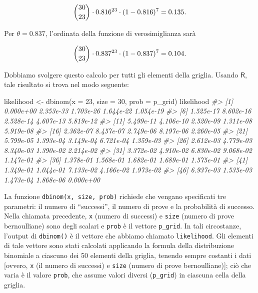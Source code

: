 \documentclass[
  11pt,
]{krantz}
\makeatletter
\newenvironment{Shaded}{\begin{snugshade}}{\end{snugshade}}
\newcommand{\AttributeTok}[1]{\textcolor[rgb]{0.61,0.61,0.61}{#1}}
\newcommand{\CommentTok}[1]{\textcolor[rgb]{0.37,0.37,0.37}{\textit{#1}}}
\newcommand{\DecValTok}[1]{\textcolor[rgb]{0.06,0.06,0.06}{#1}}
\newcommand{\FunctionTok}[1]{\textcolor[rgb]{0,0,0}{#1}}
\newcommand{\NormalTok}[1]{#1}
\newcommand{\OtherTok}[1]{\textcolor[rgb]{0.37,0.37,0.37}{#1}}
\newenvironment{kframe}{%
\medskip{}
\setlength{\fboxsep}{.8em}
 \def\at@end@of@kframe{}%
 \ifinner\ifhmode%
  \def\at@end@of@kframe{\end{minipage}}%
  \begin{minipage}{\columnwidth}%
 \fi\fi%
 \def\FrameCommand##1{\hskip\@totalleftmargin \hskip-\fboxsep
 \colorbox{shadecolor}{##1}\hskip-\fboxsep
     \hskip-\linewidth \hskip-\@totalleftmargin \hskip\columnwidth}%
 \MakeFramed {\advance\hsize-\width
   \@totalleftmargin\z@ \linewidth\hsize
   \@setminipage}}%
 {\par\unskip\endMakeFramed%
 \at@end@of@kframe}
\renewenvironment{Shaded}{\begin{kframe}}{\end{kframe}}
\newcommand{\R}{\textsf{R}} %
\theoremstyle{definition}
\theoremstyle{definition}
\theoremstyle{definition}
\theoremstyle{definition}
\theoremstyle{remark}
\makeatother
\begin{document}
\begin{equation}
\binom{30}{23} \cdot 0.816^{23} \cdot (1 - 0.816)^{7} = 0.135.\notag
\end{equation}

Per \(\theta = 0.837\), l'ordinata della funzione di verosimiglianza sarà

\begin{equation}
\binom{30}{23} \cdot 0.837^{23} \cdot (1 - 0.837)^{7} = 0.104.\notag
\end{equation}

Dobbiamo svolgere questo calcolo per tutti gli elementi della griglia. Usando \(\R\), tale risultato si trova nel modo seguente:

\begin{Shaded}
\begin{Highlighting}[]
\NormalTok{likelihood }\OtherTok{\textless{}{-}} \FunctionTok{dbinom}\NormalTok{(}\AttributeTok{x =} \DecValTok{23}\NormalTok{, }\AttributeTok{size =} \DecValTok{30}\NormalTok{, }\AttributeTok{prob =}\NormalTok{ p\_grid)}
\NormalTok{likelihood}
\CommentTok{\#\textgreater{}  [1] 0.000e+00 2.353e{-}33 1.703e{-}26 1.644e{-}22 1.054e{-}19}
\CommentTok{\#\textgreater{}  [6] 1.525e{-}17 8.602e{-}16 2.528e{-}14 4.607e{-}13 5.819e{-}12}
\CommentTok{\#\textgreater{} [11] 5.499e{-}11 4.106e{-}10 2.520e{-}09 1.311e{-}08 5.919e{-}08}
\CommentTok{\#\textgreater{} [16] 2.362e{-}07 8.457e{-}07 2.749e{-}06 8.197e{-}06 2.260e{-}05}
\CommentTok{\#\textgreater{} [21] 5.799e{-}05 1.393e{-}04 3.149e{-}04 6.721e{-}04 1.359e{-}03}
\CommentTok{\#\textgreater{} [26] 2.612e{-}03 4.779e{-}03 8.340e{-}03 1.390e{-}02 2.214e{-}02}
\CommentTok{\#\textgreater{} [31] 3.372e{-}02 4.910e{-}02 6.830e{-}02 9.068e{-}02 1.147e{-}01}
\CommentTok{\#\textgreater{} [36] 1.378e{-}01 1.568e{-}01 1.682e{-}01 1.689e{-}01 1.575e{-}01}
\CommentTok{\#\textgreater{} [41] 1.349e{-}01 1.044e{-}01 7.133e{-}02 4.166e{-}02 1.973e{-}02}
\CommentTok{\#\textgreater{} [46] 6.937e{-}03 1.535e{-}03 1.473e{-}04 1.868e{-}06 0.000e+00}
\end{Highlighting}
\end{Shaded}

La funzione \texttt{dbinom(x,\ size,\ prob)} richiede che vengano specificati tre parametri: il numero di ``successi'', il numero di prove e la probabilità di successo. Nella chiamata precedente, \texttt{x} (numero di successi) e \texttt{size} (numero di prove bernoulliane) sono degli scalari e \texttt{prob} è il vettore \texttt{p\_grid}. In tali circostanze, l'output di \texttt{dbinom()} è il vettore che abbiamo chiamato \texttt{likelihood}. Gli elementi di tale vettore sono stati calcolati applicando la formula della distribuzione binomiale a ciascuno dei 50 elementi della griglia, tenendo sempre costanti i dati {[}ovvero, \texttt{x} (il numero di successi) e \texttt{size} (numero di prove bernoulliane){]}; ciò che varia è il valore \texttt{prob}, che assume valori diversi (\texttt{p\_grid}) in ciascuna cella della griglia.
\end{document}

